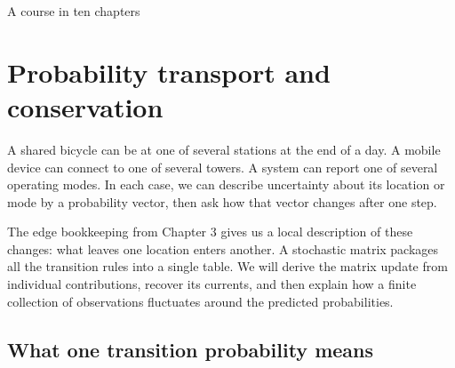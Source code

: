 \documentclass[11pt,oneside,openany]{book}
\theoremstyle{definition}
\theoremstyle{remark}
\numberwithin{equation}{chapter}
\begin{document}
\begin{titlepage}\color{ink}\centering\vspace*{1.0in}{\small\sffamily PROBABILITY AND MATHEMATICAL MODELLING\par}\vspace{.45in}{\Huge\bfseries Discrete Information\\[.12in]Geometry\par}\vspace{.35in}{\Large Finite Differences, Probability,\\and Information Flows\par}\vspace{1cm}{\Large Chapter 4\par}\vfill{}\vfill{\large A course in ten chapters\par}\end{titlepage}
\setcounter{chapter}{3}

\chapter{Probability transport and conservation}
A shared bicycle can be at one of several stations at the end of a day. A mobile device can connect to one of several towers. A system can report one of several operating modes. In each case, we can describe uncertainty about its location or mode by a probability vector, then ask how that vector changes after one step.

The edge bookkeeping from Chapter 3 gives us a local description of these changes: what leaves one location enters another. A stochastic matrix packages all the transition rules into a single table. We will derive the matrix update from individual contributions, recover its currents, and then explain how a finite collection of observations fluctuates around the predicted probabilities.

\section{What one transition probability means}\label{ch04-what-one-transition-probability-means}
\end{document}
